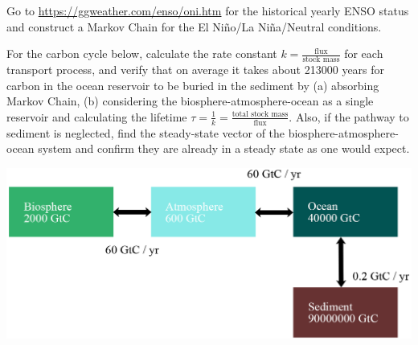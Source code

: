 \begin{Exercise}
Go to \href{https://ggweather.com/enso/oni.htm}{https://ggweather.com/enso/oni.htm} for the historical yearly ENSO status and construct a Markov Chain for the El Niño/La Niña/Neutral conditions.
\end{Exercise}

\begin{Exercise}
For the carbon cycle below, calculate the rate constant $k = \frac{\text{flux}}{\text{stock mass}}$ for each transport process, and verify that on average it takes about 213000 years for carbon in the ocean reservoir to be buried in the sediment by (a) absorbing Markov Chain, (b) considering the biosphere-atmosphere-ocean as a single reservoir and calculating the lifetime $\tau = \frac{1}{k} = \frac{\text{total stock mass}}{\text{flux}}$. Also, if the pathway to sediment is neglected, find the steady-state vector of the biosphere-atmosphere-ocean system and confirm they are already in a steady state as one would expect.
\begin{center}
\includegraphics[scale = 1]{graphics/carboncycle.png}
\end{center}
\end{Exercise}

